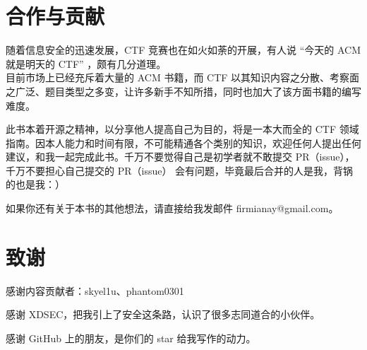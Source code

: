 \section{合作与贡献}
\indent \setlength{\parindent}{2em}

    \indent 随着信息安全的迅速发展，CTF 竞赛也在如火如荼的开展，有人说 “今天的 ACM 就是明天的 CTF” ，颇有几分道理。
    \\目前市场上已经充斥着大量的 ACM 书籍，而 CTF 以其知识内容之分散、考察面之广泛、题目类型之多变，让许多新手不知所措，同时也加大了该方面书籍的编写难度。

    \indent 此书本着开源之精神，以分享他人提高自己为目的，将是一本大而全的 CTF 领域指南。因本人能力和时间有限，不可能精通各个类别的知识，欢迎任何人提出任何建议，和我一起完成此书。千万不要觉得自己是初学者就不敢提交 PR（issue），千万不要担心自己提交的 PR（issue） 会有问题，毕竟最后合并的人是我，背锅的也是我：）

    \indent 如果你还有关于本书的其他想法，请直接给我发邮件 firmianay@gmail.com。

\section{致谢}
\indent \setlength{\parindent}{2em}

\indent 感谢内容贡献者：skyel1u、phantom0301

\indent 感谢 XDSEC，把我引上了安全这条路，认识了很多志同道合的小伙伴。

\indent 感谢 GitHub 上的朋友，是你们的 star 给我写作的动力。
